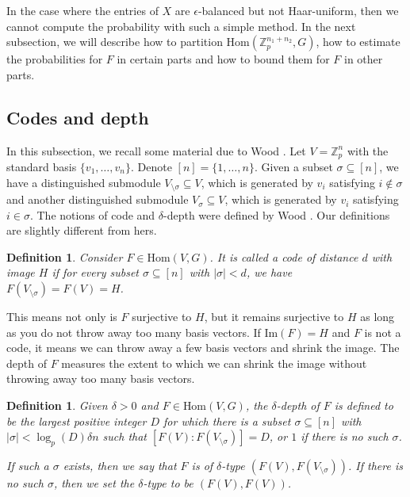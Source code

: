 \documentclass[12pt]{amsart}
\newtheorem{definition}[theorem]{Definition}
\theoremstyle{definition}
\newcommand{\Vsigma}{V_{\setminus\sigma}}
\newcommand{\abs}[1]{\vert#1\vert}
\newcommand{\im}{\text{Im}}
\newcommand{\Zpnot}{\Z_p^{n_1+n_2}}
\newcommand{\Z}{\mathbb{Z}}
\newcommand{\Hom}{\text{Hom}}
\begin{document}
In the case where the entries of $X$ are $\epsilon$-balanced but not Haar-uniform, then we cannot compute the probability with such a simple method.
In the next subsection, we will describe how to partition $\Hom(\Zpnot,G)$, how to estimate the probabilities for $F$ in certain parts and how to bound them for $F$ in other parts.







\subsection{Codes and depth}

In this subsection, we recall some material due to Wood \cite{wood2017distribution,wood2019random}.
Let $V=\Z_p^n$ with the standard basis $\{v_1,\dots,v_n\}$. Denote $[n]=\{1,\dots,n\}$. Given a subset $\sigma\subseteq [n]$, we have a distinguished submodule $\Vsigma\subseteq V$, which is generated by $v_i$ satisfying $i\notin \sigma$ and another distinguished submodule $V_{\sigma}\subseteq V$, which is generated by $v_i$ satisfying $i\in \sigma$. The notions of code and $\delta$-depth were defined by Wood \cite{wood2019random}. Our definitions are slightly different from hers.

\begin{definition}
Consider $F\in \Hom(V,G)$. It is called a code of distance $d$ with image $H$ if for every subset $\sigma\subseteq [n]$ with $\abs{\sigma}<d$, we have $F(\Vsigma)=F(V)=H$.
\end{definition}
This means not only is $F$ surjective to $H$, but it remains surjective to $H$ as long as you do not throw away too many basis vectors.
If $\im(F)=H$ and $F$ is not a code, it means we can throw away a few basis vectors and shrink the image. The depth of $F$ measures the extent to which we can shrink the image without throwing away too many basis vectors.

\begin{definition}
Given $\delta>0$ and $F\in\Hom(V,G)$, the $\delta$-depth of $F$ is defined to be the largest positive integer $D$ for which there is a subset $\sigma\subseteq [n]$ with $\abs{\sigma}<\log_p(D)\delta n$ such that $[F(V):F(\Vsigma)]=D$, or $1$ if there is no such $\sigma$.

If such a $\sigma$ exists, then we say that $F$ is of $\delta$-type $(F(V),F(\Vsigma))$. If there is no such $\sigma$, then we set the $\delta$-type to be $(F(V), F(V))$.
\end{definition}
\end{document}
